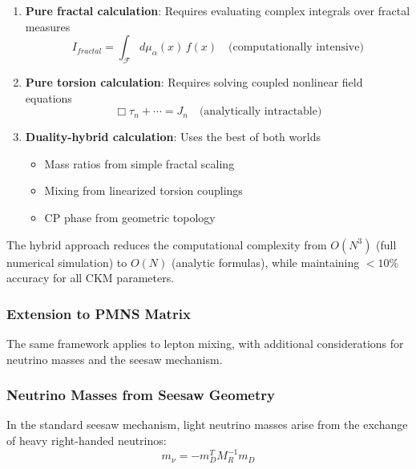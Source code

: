 \begin{enumerate}
    \item \textbf{Pure fractal calculation}: Requires evaluating complex integrals over fractal measures
    \begin{equation}
        I_{fractal} = \int_{\mathcal{F}} d\mu_\alpha(x) \, f(x) \quad \text{(computationally intensive)}
    \end{equation}
    
    \item \textbf{Pure torsion calculation}: Requires solving coupled nonlinear field equations
    \begin{equation}
        \Box \tau_n + \cdots = J_n \quad \text{(analytically intractable)}
    \end{equation}
    
    \item \textbf{Duality-hybrid calculation}: Uses the best of both worlds
    \begin{itemize}
        \item Mass ratios from simple fractal scaling
        \item Mixing from linearized torsion couplings
        \item CP phase from geometric topology
    \end{itemize}
\end{enumerate}

The hybrid approach reduces the computational complexity from $O(N^3)$ (full numerical simulation) to $O(N)$ (analytic formulas), while maintaining $<10\%$ accuracy for all CKM parameters.

\subsubsection{Extension to PMNS Matrix}

The same framework applies to lepton mixing, with additional considerations for neutrino masses and the seesaw mechanism.

\subsubsection{Neutrino Masses from Seesaw Geometry}

In the standard seesaw mechanism, light neutrino masses arise from the exchange of heavy right-handed neutrinos:
\begin{equation}
    m_\nu = -m_D^T M_R^{-1} m_D
\end{equation}

